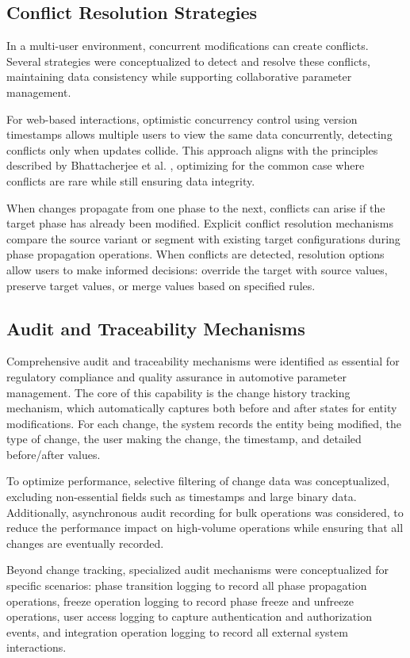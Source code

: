 \subsection{Conflict Resolution Strategies}
\label{subsec:conflict-resolution-strategies}

In a multi-user environment, concurrent modifications can create conflicts. Several strategies were conceptualized to detect and resolve these conflicts, maintaining data consistency while supporting collaborative parameter management.

For web-based interactions, optimistic concurrency control using version timestamps allows multiple users to view the same data concurrently, detecting conflicts only when updates collide. This approach aligns with the principles described by Bhattacherjee et al. \cite{bhattacherjee2015principles}, optimizing for the common case where conflicts are rare while still ensuring data integrity.

When changes propagate from one phase to the next, conflicts can arise if the target phase has already been modified. Explicit conflict resolution mechanisms compare the source variant or segment with existing target configurations during phase propagation operations. When conflicts are detected, resolution options allow users to make informed decisions: override the target with source values, preserve target values, or merge values based on specified rules.

\subsection{Audit and Traceability Mechanisms}
\label{subsec:audit-mechanisms}

Comprehensive audit and traceability mechanisms were identified as essential for regulatory compliance and quality assurance in automotive parameter management. The core of this capability is the change history tracking mechanism, which automatically captures both before and after states for entity modifications. For each change, the system records the entity being modified, the type of change, the user making the change, the timestamp, and detailed before/after values.

To optimize performance, selective filtering of change data was conceptualized, excluding non-essential fields such as timestamps and large binary data. Additionally, asynchronous audit recording for bulk operations was considered, to reduce the performance impact on high-volume operations while ensuring that all changes are eventually recorded.

Beyond change tracking, specialized audit mechanisms were conceptualized for specific scenarios: phase transition logging to record all phase propagation operations, freeze operation logging to record phase freeze and unfreeze operations, user access logging to capture authentication and authorization events, and integration operation logging to record all external system interactions.